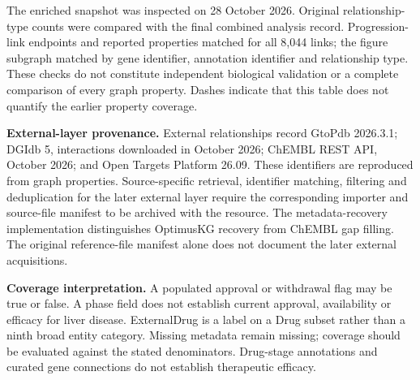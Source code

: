 \small
The enriched snapshot was inspected on 28 October 2026. Original relationship-type counts were compared with the final combined analysis record. Progression-link endpoints and reported properties matched for all 8,044 links; the figure subgraph matched by gene identifier, annotation identifier and relationship type. These checks do not constitute independent biological validation or a complete comparison of every graph property. Dashes indicate that this table does not quantify the earlier property coverage.

\textbf{External-layer provenance.} External relationships record GtoPdb 2026.3.1; DGIdb 5, interactions downloaded in October 2026; ChEMBL REST API, October 2026; and Open Targets Platform 26.09. These identifiers are reproduced from graph properties. Source-specific retrieval, identifier matching, filtering and deduplication for the later external layer require the corresponding importer and source-file manifest to be archived with the resource. The metadata-recovery implementation distinguishes OptimusKG recovery from ChEMBL gap filling. The original reference-file manifest alone does not document the later external acquisitions.

\textbf{Coverage interpretation.} A populated approval or withdrawal flag may be true or false. A phase field does not establish current approval, availability or efficacy for liver disease. ExternalDrug is a label on a Drug subset rather than a ninth broad entity category. Missing metadata remain missing; coverage should be evaluated against the stated denominators. Drug-stage annotations and curated gene connections do not establish therapeutic efficacy.
\endgroup

